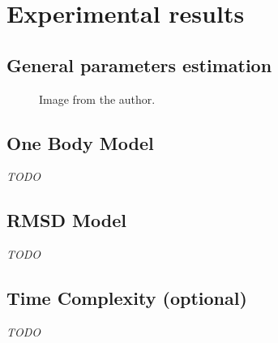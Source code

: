 \documentclass[/home/francois/latex/report/main.tex]{subfiles}
\begin{document}
\chapter{Experimental results}
\label{chapter:results}

\section{General parameters estimation}
\label{section:results-general-parameters}


\begin{figure}[H]
  \centering
  \caption{ Image from the author.}
  \label{fig:results:torque_}
\end{figure}

\section{One Body Model}

\textit{TODO}

\section{RMSD Model}

\textit{TODO}

\section{Time Complexity (optional)}

\textit{TODO}
\end{document}
